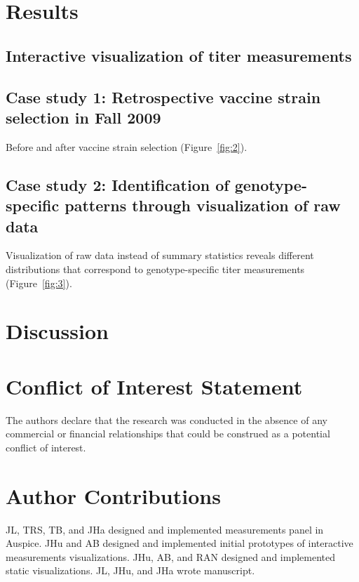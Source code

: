 \documentclass[utf8]{FrontiersinHarvard} %
\begin{document}
\section{Results}

\subsection{Interactive visualization of titer measurements}

\subsection{Case study 1: Retrospective vaccine strain selection in Fall 2009}

Before and after vaccine strain selection (Figure~\ref{fig:2}).

\subsection{Case study 2: Identification of genotype-specific patterns through visualization of raw data}

Visualization of raw data instead of summary statistics reveals different distributions that correspond to genotype-specific titer measurements (Figure~\ref{fig:3}).

\section{Discussion}

\section*{Conflict of Interest Statement}

The authors declare that the research was conducted in the absence of any commercial or financial relationships that could be construed as a potential conflict of interest.

\section*{Author Contributions}

JL, TRS, TB, and JHa designed and implemented measurements panel in Auspice.
JHu and AB designed and implemented initial prototypes of interactive measurements visualizations.
JHu, AB, and RAN designed and implemented static visualizations.
JL, JHu, and JHa wrote manuscript.
\end{document}
